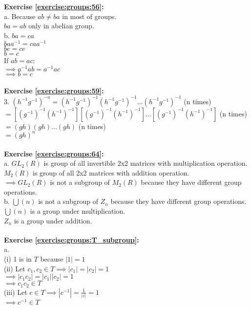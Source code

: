 \textbf{Exercise \ref{exercise:groups:56}:}\\
a. Because $ab\neq ba$ in most of groups.\\
$ba=ab$ only in abelian group.\\
b. $ba=ca$\\
$baa^{-1}=caa^{-1}$\\
$be=ce$\\
$b=c$\\
If $ab=ac$:\\
$\implies a^{-1}ab=a^{-1}ac$\\
$\implies b=c$\\
\\
\textbf{Exercise \ref{exercise:groups:59}:}\\
3. $(h^{-1}g^{-1})^{-n}=(h^{-1}g^{-1})^{-1}(h^{-1}g^{-1})^{-1}...(h^{-1}g^{-1})^{-1}$ (n times)\\
$=[(g^{-1})^{-1}(h^{-1})^{-1}][(g^{-1})^{-1}(h^{-1})^{-1}]...[(g^{-1})^{-1}(h^{-1})^{-1}]$ (n times)\\
$=(gh)(gh)...(gh)$ (n times)\\
$=(gh)^n$\\
\\
\textbf{Exercise \ref{exercise:groups:64}:}\\
a. $GL_2(R)$ is group of all invertible 2x2 matrices with multiplication operation.\\
$M_2(R)$ is group of all 2x2 matrices with addition operation.\\
$\implies GL_2(R)$ is not a subgroup of $M_2(R)$ because they have different group operations.\\
b. $\bigcup(n)$ is not a subgroup of $Z_n$ because they have different group operations.\\
$\bigcup(n)$ is a group under multiplication.\\
$Z_n$ is a group under addition.\\
\\
\textbf{Exercise \ref{exercise:groups:T_subgroup}:}\\
a.\\
(i) 1 is in $T$ because $|1|=1$\\
(ii) Let $c_1,c_2\in T\implies |c_1|=|c_2|=1$\\
$\implies |c_1c_2|=|c_1||c_2|=1$\\
$\implies c_1c_2\in T$\\
(iii) Let $c\in T \implies |c^{-1}|=\displaystyle\frac{1}{|c|}=1$\\
$\implies c^{-1}\in T$\\
